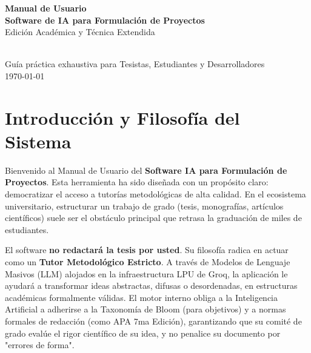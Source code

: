 \documentclass[12pt,a4paper]{article}
\begin{document}
\begin{titlepage}
    \centering
    \vspace*{2cm}
    
    {\Huge \textbf{Manual de Usuario}}\\[1cm]
    {\LARGE \textbf{Software de IA para Formulación de Proyectos}}\\[1.5cm]
    {\Large Edición Académica y Técnica Extendida}\\[1.5cm]
    
    \\[3cm]
    
    {\Large Guía práctica exhaustiva para Tesistas, Estudiantes y Desarrolladores}\\[1.5cm]
    
    \vfill
    {\large \today}\\[1cm]
\end{titlepage}

\tableofcontents
\newpage

\section{Introducción y Filosofía del Sistema}
Bienvenido al Manual de Usuario del \textbf{Software IA para Formulación de Proyectos}. Esta herramienta ha sido diseñada con un propósito claro: democratizar el acceso a tutorías metodológicas de alta calidad. En el ecosistema universitario, estructurar un trabajo de grado (tesis, monografías, artículos científicos) suele ser el obstáculo principal que retrasa la graduación de miles de estudiantes.

El software \textbf{no redactará la tesis por usted}. Su filosofía radica en actuar como un \textbf{Tutor Metodológico Estricto}. A través de Modelos de Lenguaje Masivos (LLM) alojados en la infraestructura LPU de Groq, la aplicación le ayudará a transformar ideas abstractas, difusas o desordenadas, en estructuras académicas formalmente válidas. El motor interno obliga a la Inteligencia Artificial a adherirse a la Taxonomía de Bloom (para objetivos) y a normas formales de redacción (como APA 7ma Edición), garantizando que su comité de grado evalúe el rigor científico de su idea, y no penalice su documento por "errores de forma".
\end{document}
